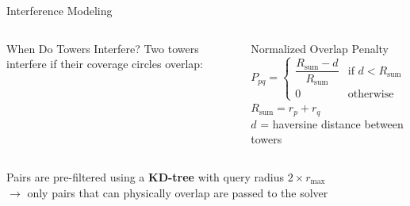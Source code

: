 \begin{frame}[t]{Interference Modeling}{}
    \begin{columns}[T]
        \begin{block}{When Do Towers Interfere?}
            Two towers interfere if their coverage circles overlap:
            \begin{center}
            \end{center}
        \end{block}

        \begin{block}{Normalized Overlap Penalty}
            \begin{equation*}
                P_{pq} = \begin{cases}
                    \dfrac{R_{\text{sum}} - d}{R_{\text{sum}}}
                        & \text{if } d < R_{\text{sum}} \\[10pt]
                    0   & \text{otherwise}
                \end{cases}
            \end{equation*}
            \vspace{-0.2cm}
            {\small
            $R_{\text{sum}} = r_p + r_q$\\
            $d$ = haversine distance between towers
            }
        \end{block}
    \end{columns}

    \vspace{0.2cm}
    \begin{center}
        \small
        Pairs are pre-filtered using a \textbf{KD-tree} with query radius $2 \times r_{\max}$ \\
        $\rightarrow$ only pairs that can physically overlap are passed to the solver
    \end{center}
\end{frame}

